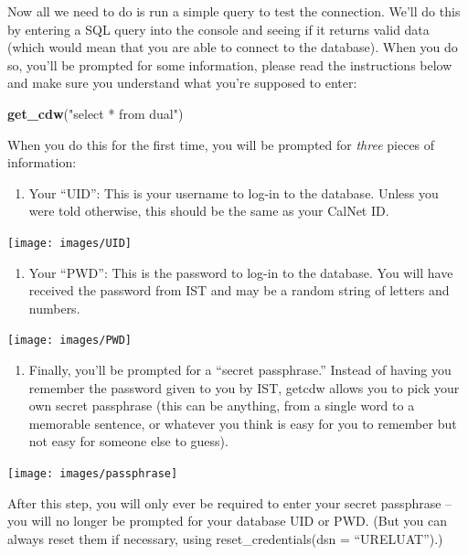 \documentclass[]{book}
\newenvironment{Shaded}{\begin{snugshade}}{\end{snugshade}}
\newcommand{\KeywordTok}[1]{\textcolor[rgb]{0.13,0.29,0.53}{\textbf{#1}}}
\newcommand{\NormalTok}[1]{#1}
\newcommand{\StringTok}[1]{\textcolor[rgb]{0.31,0.60,0.02}{#1}}
\providecommand{\tightlist}{%
  \setlength{\itemsep}{0pt}\setlength{\parskip}{0pt}}
\begin{document}
Now all we need to do is run a simple query to test the connection. We'll do this by entering a SQL query into the console and seeing if it returns valid data (which would mean that you are able to connect to the database). When you do so, you'll be prompted for some information, please read the instructions below and make sure you understand what you're supposed to enter:

\begin{Shaded}
\begin{Highlighting}[]
\KeywordTok{get_cdw}\NormalTok{(}\StringTok{"select * from dual"}\NormalTok{)}
\end{Highlighting}
\end{Shaded}

When you do this for the first time, you will be prompted for \emph{three} pieces of information:

\begin{enumerate}
\def\labelenumi{\arabic{enumi})}
\tightlist
\item
  Your ``UID'': This is your username to log-in to the database. Unless you were told otherwise, this should be the same as your CalNet ID.
\end{enumerate}

\texttt{[image: images/UID]}

\begin{enumerate}
\def\labelenumi{\arabic{enumi})}
\setcounter{enumi}{1}
\tightlist
\item
  Your ``PWD'': This is the password to log-in to the database. You will have received the password from IST and may be a random string of letters and numbers.
\end{enumerate}

\texttt{[image: images/PWD]}

\begin{enumerate}
\def\labelenumi{\arabic{enumi})}
\setcounter{enumi}{2}
\tightlist
\item
  Finally, you'll be prompted for a ``secret passphrase.'' Instead of having you remember the password given to you by IST, getcdw allows you to pick your own secret passphrase (this can be anything, from a single word to a memorable sentence, or whatever you think is easy for you to remember but not easy for someone else to guess).
\end{enumerate}

\texttt{[image: images/passphrase]}

After this step, you will only ever be required to enter your secret passphrase -- you will no longer be prompted for your database UID or PWD. (But you can always reset them if necessary, using reset\_credentials(dsn = ``URELUAT'').)
\end{document}
